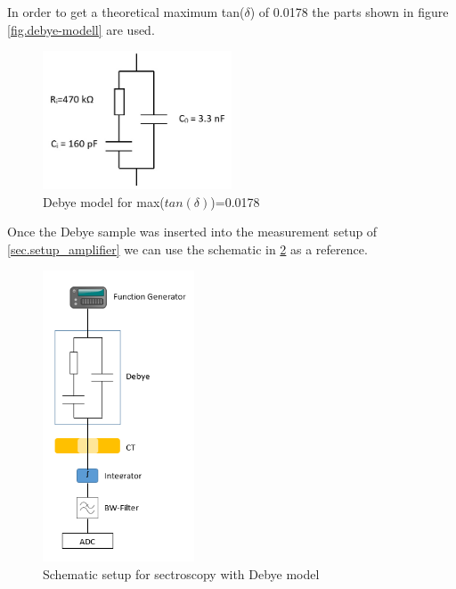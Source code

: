 In order to get a theoretical maximum tan($\delta$) of 0.0178 the parts shown in figure \ref{fig.debye-modell} are used. 
\begin{figure}[h!tb]
	\centerline{\includegraphics[width=0.5\textwidth]{figures/Method/debye-modell.jpg}}	
	\caption{Debye model for max($tan(\delta)$)=0.0178 }	
	\label{fig.debye-modellsch}
\end{figure}

Once the Debye sample  was inserted into the measurement setup of \ref{sec.setup_amplifier} we can use the schematic in \ref{fig.presentation} as a reference.

\begin{figure}[h!tb]
	\centerline{\includegraphics[width=0.4\textwidth]{figures/Method/setup/low_voltage_setup.png}}	
	\caption{Schematic setup for sectroscopy with Debye model}	
	\label{fig.presentation}
\end{figure}

